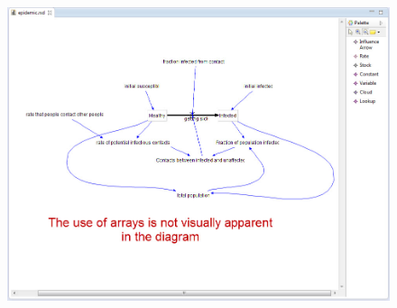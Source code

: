 \documentclass[11pt]{amsart}
\begin{document}
\begin{figure}[ht]
\begin{center}
\vspace{.2in}
\centerline {
\includegraphics[totalheight=0.35\textheight]{images/060.jpg}
}
\caption{}
\label{fig:060}
\end{center}
\end{figure}
\end{document}
